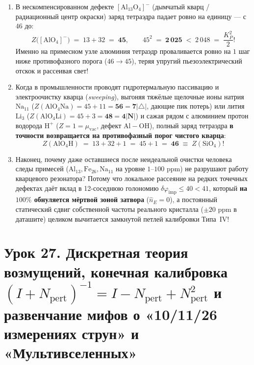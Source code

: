 \begin{enumerate}[label=\textbf{\arabic*.},leftmargin=*]
\begin{itemize}[noitemsep]
    \begin{enumerate}[label=(\alph*),noitemsep]
    \item В нескомпенсированном дефекте $[\mathrm{Al}_{13}\mathrm{O}_4]^-$ (дымчатый кварц / радиационный центр окраски) заряд тетраэдра падает ровно на единицу --- с $46$ до:
      \[
        Z\bigl([\mathrm{AlO_4}]^-\bigr) \;=\; 13 + 32 \;=\; \mathbf{45}, \qquad 45^2 \;=\; \mathbf{2\,025} \;<\; 2\,048 \;=\; \frac{K_P^2}{2}!
      \]
      Именно на примесном узле алюминия тетраэдр проваливается ровно на $1$ шаг ниже противофазного порога ($46\to 45$), теряя упругий пьезоэлектрический отскок и рассеивая свет!
    \item Когда в промышленности проводят гидротермальную пассивацию и электроочистку кварца (\emph{sweeping}), выгоняя тяжёлые щелочные ионы натрия $\mathrm{Na}_{11}$ ($Z(\mathrm{AlO_4Na}) = 45 + 11 = \mathbf{56 = 7|{\triangle}|}$, дающие пик потерь) или лития $\mathrm{Li}_3$ ($Z(\mathrm{AlO_4Li}) = 45 + 3 = \mathbf{48 = 4|N|}$) и сажая рядом с алюминием протон водорода $\mathrm{H}^+$ ($Z = 1 = \mu_{\mathrm{vac}}$, дефект $\mathrm{Al{-}OH}$), полный заряд тетраэдра \textbf{в точности возвращается на противофазный порог чистого кварца}:
      \[
        Z(\mathrm{AlO_4H}) \;=\; 13 + 32 + 1 \;=\; 45 + 1 \;=\; \mathbf{46} \;\equiv\; Z(\mathrm{SiO_4})!
      \]
    \item Наконец, почему даже оставшиеся после неидеальной очистки человека следы примесей ($\mathrm{Al}_{13}, \mathrm{Fe}_{26}, \mathrm{Na}_{11}$ на уровне $1\text{--}100\text{ ppm}$) не разрушают работу кварцевого резонатора? Потому что локальное рассеяние на редких точечных дефектах даёт вклад в 12-соседнюю голономию $\delta\varphi_{\mathrm{imp}} \le 40 < 41$, который \textbf{на $100\%$ обнуляется мёртвой зоной затвора} ($\hat{n}_E = 0$), а постоянный статический сдвиг собственной частоты реального кристалла ($\pm 20\text{ ppm}$ в даташите) целиком вычитается замкнутой петлей калибровки Типа~IV!
    \end{enumerate}
  \end{itemize}
\end{enumerate}

\section{Урок 27. Дискретная теория возмущений, конечная калибровка $(I + N_{\mathrm{pert}})^{-1} = I - N_{\mathrm{pert}} + N_{\mathrm{pert}}^2$ и развенчание мифов о «10/11/26 измерениях струн» и «Мультивселенных»}

